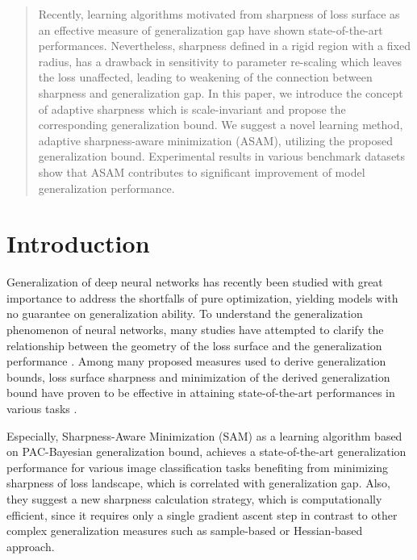 \documentclass{article}
\begin{document}
\begin{abstract}

Recently, learning algorithms motivated from sharpness of loss surface as an effective measure of generalization gap have shown state-of-the-art performances. Nevertheless, sharpness defined in a rigid region with a fixed radius, has a drawback in sensitivity to parameter re-scaling which leaves the loss unaffected, leading to weakening of the connection between sharpness and generalization gap. In this paper, we introduce the concept of adaptive sharpness which is scale-invariant and propose the corresponding generalization bound. We suggest a novel learning method, adaptive sharpness-aware minimization (ASAM), utilizing the proposed generalization bound. Experimental results in various benchmark datasets show that ASAM contributes to significant improvement of model generalization performance.


\end{abstract}

\section{Introduction}
\label{introduction}

Generalization of deep neural networks has recently been studied with great importance to address the shortfalls of pure optimization, yielding models with no guarantee on generalization ability. 
To understand the generalization phenomenon of neural networks, many studies have attempted to clarify the relationship between the geometry of the loss surface and the generalization performance \citep{hochreiter1995simplifying, mcallester1999pac, keskar2017large, neyshabur2017exploring, jiang2019fantastic}. 
Among many proposed measures used to derive generalization bounds, loss surface sharpness and 
minimization of the derived generalization bound have proven to be effective in attaining state-of-the-art performances in various tasks \citep{hochreiter1997flat, mobahi2016training, chaudhari2019entropy, DBLP:journals/corr/abs-2006-05620, yue2020salr}.


Especially, Sharpness-Aware Minimization (SAM) \citep{foret2021sharpnessaware} as a learning algorithm based on PAC-Bayesian generalization bound, achieves a state-of-the-art generalization performance for various image classification tasks benefiting from minimizing sharpness of loss landscape, which is correlated with generalization gap. Also, they suggest a new sharpness calculation strategy, which is computationally efficient, since it requires only a single gradient ascent step in contrast to other complex generalization measures such as sample-based or Hessian-based approach. 
\end{document}
